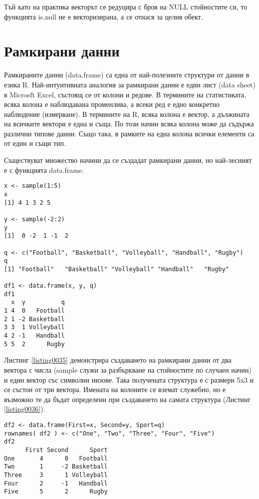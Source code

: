 Тъй като на практика векторът се редуцира с броя на NULL стойностите си, то функцията is.null не е векторизирана, а се отнася за целия обект. 

\section{Рамкирани данни}

Рамкираните данни (data.frame) са една от най-полезните структури от данни в езика R. Най-интуитивната аналогия за рамкирани данни е един лист (data sheet) в Microsft Excel, състоящ се от колони и редове. В термините на статистиката, всяка колона е наблюдавана променлива, а всеки ред е едно конкретно наблюдение (измерване). В термините на R, всяка колона е вектор, а дължината на всичките вектори е една и съща. По този начин всяка колона може да съдържа различни типове данни. Също така, в рамките на една колона всички елементи са от един и същи тип. 

Съществуват множество начини да се създадат рамкирани данни, но най-лесният е с функцията data.frame.

\begin{lstlisting}[caption=Създаване на рамкирани данни, label=listing0035]
x <- sample(1:5)
x
[1] 4 1 3 2 5

y <- sample(-2:2)
y
[1]  0 -2  1 -1  2

q <- c("Football", "Basketball", "Volleyball", "Handball", "Rugby")
q
[1] "Football"   "Basketball" "Volleyball" "Handball"   "Rugby"

df1 <- data.frame(x, y, q)
df1
  x  y          q
1 4  0   Football
2 1 -2 Basketball
3 3  1 Volleyball
4 2 -1   Handball
5 5  2      Rugby
\end{lstlisting}

Листинг \ref{listing0035} демонстрира създаването на рамкирани данни от два вектора с числа (sample служи за разбъркване на стойностите по случаен начин) и един вектор със символни низове. Така получената структура е с размери 5x3 и се състои от три вектора. Имената на колоните се вземат служебно, но е възможно те да бъдат определени при създаването на самата структура (Листинг \ref{listing0036}).

\begin{lstlisting}[caption=Създаване на рамкирани данни с имена на колоните, label=listing0036]
df2 <- data.frame(First=x, Second=y, Sport=q)
rownames( df2 ) <- c("One", "Two", "Three", "Four", "Five")
df2
      First Second      Sport
One       4      0   Football
Two       1     -2 Basketball
Three     3      1 Volleyball
Four      2     -1   Handball
Five      5      2      Rugby
\end{lstlisting}

